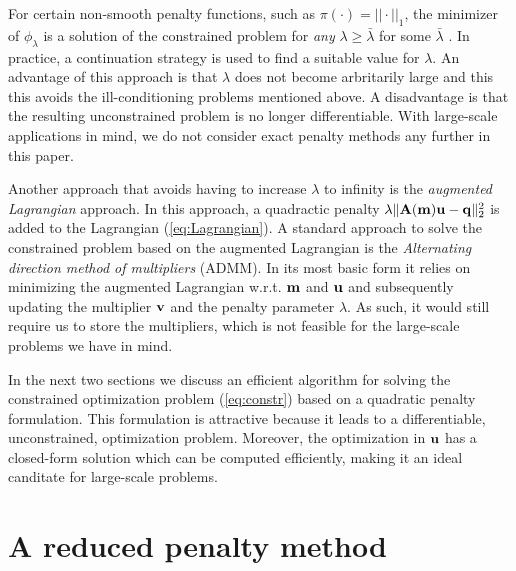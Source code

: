 \documentclass{iopart}
\begin{document}
For certain non-smooth penalty functions, such as $\pi(\cdot) = ||\cdot||_1$, the minimizer of $\phi_{\lambda}$
is a solution of the constrained problem for \emph{any} $\lambda \geq \bar{\lambda}$ for some $\bar{\lambda}$
\cite[Thm. 17.3]{Nocedal}. In practice, a continuation
strategy is used to find a suitable value for $\lambda$. An advantage of this approach is that $\lambda$ does
not become arbritarily large and this this avoids the ill-conditioning problems mentioned above. A disadvantage
is that the resulting unconstrained problem is no longer differentiable. 
With large-scale applications in mind, we do not consider exact penalty methods any further in this paper.

Another approach that avoids having to increase $\lambda$ to infinity is the \emph{augmented Lagrangian} approach. In this approach, a quadractic penalty $\lambda\|\mathbf{A}(\mathbf{m})\mathbf{u} - \mathbf{q}\|_2^2$ is
added to the Lagrangian (\ref{eq:Lagrangian}). A standard approach to solve the constrained problem based on the augmented Lagrangian
is the \emph{Alternating direction method of multipliers} (ADMM). In its most basic form it relies on minimizing the augmented Lagrangian w.r.t. $\mathbf{m}$
and $\mathbf{u}$ and subsequently updating the multiplier $\mathbf{v}$ and the penalty parameter $\lambda$. As such, it would still require us to store
the multipliers, which is not feasible for the large-scale problems we have in mind.

In the next two sections we discuss an efficient algorithm for solving the constrained optimization problem (\ref{eq:constr}) based
on a quadratic penalty formulation. This formulation is attractive because it leads to a differentiable, unconstrained, optimization problem.
Moreover, the optimization in $\mathbf{u}$ has a closed-form solution which can be computed efficiently, making it an ideal canditate for large-scale
problems.

\section{A reduced penalty method}
\label{varpro}
\end{document}
